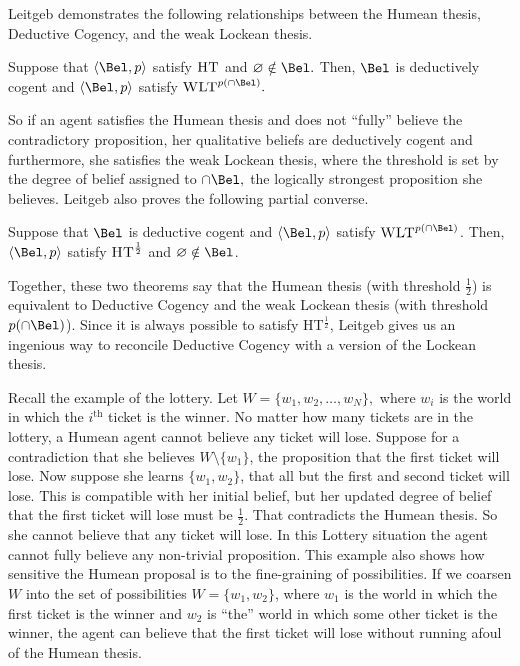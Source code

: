 Leitgeb demonstrates the following relationships between the Humean thesis,
Deductive Cogency, and the weak Lockean thesis.
\begin{theorem}
  Suppose that $\langle \Bel, p \rangle$ satisfy $\textsc{HT}$ and $\varnothing
  \notin \Bel.$ Then, $\Bel$ is deductively cogent and $\langle \Bel, p\rangle$
  satisfy $\textsc{WLT}^{p(\cap \Bel)}.$
\end{theorem}
So if an agent satisfies the Humean thesis and does not ``fully'' believe the
contradictory proposition, her qualitative beliefs are deductively cogent and
furthermore, she satisfies the weak Lockean thesis, where the threshold is set
by the degree of belief assigned to $\cap\Bel,$ the logically strongest
proposition she believes. Leitgeb also proves the following partial converse.
\begin{theorem}
Suppose that $\Bel$ is deductive cogent and $\langle \Bel, p \rangle$ satisfy
$\textsc{WLT}^{p(\cap \Bel)}$. Then, $\langle \Bel, p \rangle$ satisfy
$\textsc{HT}^{\frac{1}{2}}$ and $\varnothing \notin \Bel$.
\end{theorem}
Together, these two theorems say that the Humean thesis (with threshold
$\frac{1}{2}$) is equivalent to Deductive Cogency and the weak Lockean thesis
(with threshold $p(\cap\Bel)$). Since it is always possible to satisfy
HT$^\frac{1}{2}$, Leitgeb gives us an ingenious way to reconcile Deductive
Cogency with a version of the Lockean thesis.

Recall the example of the lottery. Let $W=\{w_1, w_2, \ldots, w_N \},$ where
$w_i$ is the world in which the $i^{\text{th}}$ ticket is the winner.  No matter
how many tickets are in the lottery, a Humean agent cannot believe any ticket
will lose. Suppose for a contradiction that she believes $W\setminus \{w_1\}$,
the proposition that the first ticket will lose. Now suppose she learns $\{w_1,
w_2\}$, that all but the first and second ticket will lose. This is compatible
with her initial belief, but her updated degree of belief that the first ticket
will lose must be $\frac{1}{2}$. That contradicts the Humean thesis. So she
cannot believe that any ticket will lose. In this Lottery situation the agent
cannot fully believe any non-trivial proposition. This example also shows how
sensitive the Humean proposal is to the fine-graining of possibilities. If we
coarsen $W$ into the set of possibilities $W=\{w_1, w_2\}$, where $w_1$ is the
world in which the first ticket is the winner and $w_2$ is ``the'' world in
which some other ticket is the winner, the agent can believe that the first
ticket will lose without running afoul of the Humean thesis.  

